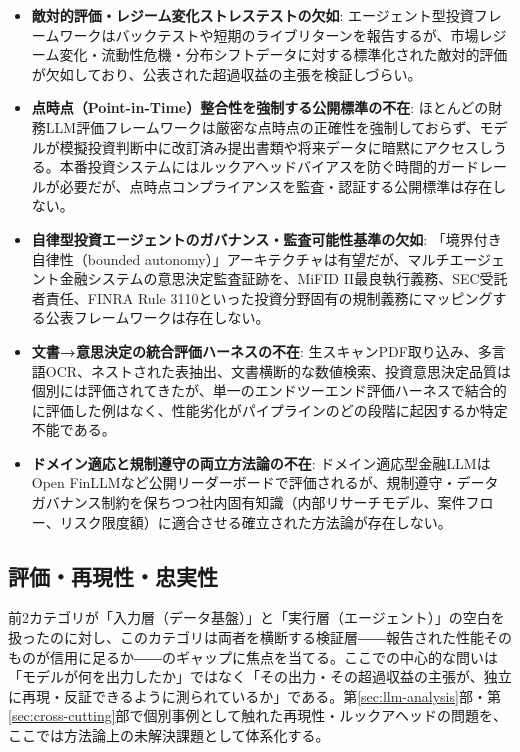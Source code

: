 \begin{itemize}
  \item \textbf{敵対的評価・レジーム変化ストレステストの欠如}: エージェント型投資フレームワークはバックテストや短期のライブリターンを報告するが、市場レジーム変化・流動性危機・分布シフトデータに対する標準化された敵対的評価が欠如しており、公表された超過収益の主張を検証しづらい。
  \item \textbf{点時点（Point-in-Time）整合性を強制する公開標準の不在}: ほとんどの財務LLM評価フレームワークは厳密な点時点の正確性を強制しておらず、モデルが模擬投資判断中に改訂済み提出書類や将来データに暗黙にアクセスしうる。本番投資システムにはルックアヘッドバイアスを防ぐ時間的ガードレールが必要だが、点時点コンプライアンスを監査・認証する公開標準は存在しない。
  \item \textbf{自律型投資エージェントのガバナンス・監査可能性基準の欠如}: 「境界付き自律性（bounded autonomy）」アーキテクチャは有望だが、マルチエージェント金融システムの意思決定監査証跡を、MiFID II最良執行義務、SEC受託者責任、FINRA Rule 3110といった投資分野固有の規制義務にマッピングする公表フレームワークは存在しない。
  \item \textbf{文書→意思決定の統合評価ハーネスの不在}: 生スキャンPDF取り込み、多言語OCR、ネストされた表抽出、文書横断的な数値検索、投資意思決定品質は個別には評価されてきたが、単一のエンドツーエンド評価ハーネスで結合的に評価した例はなく、性能劣化がパイプラインのどの段階に起因するか特定不能である。
  \item \textbf{ドメイン適応と規制遵守の両立方法論の不在}: ドメイン適応型金融LLMはOpen FinLLM\cite{finllmleaderboard2025}など公開リーダーボードで評価されるが、規制遵守・データガバナンス制約を保ちつつ社内固有知識（内部リサーチモデル、案件フロー、リスク限度額）に適合させる確立された方法論が存在しない。
\end{itemize}

\subsection{評価・再現性・忠実性}

前2カテゴリが「入力層（データ基盤）」と「実行層（エージェント）」の空白を扱ったのに対し、このカテゴリは両者を横断する検証層――報告された性能そのものが信用に足るか――のギャップに焦点を当てる。ここでの中心的な問いは「モデルが何を出力したか」ではなく「その出力・その超過収益の主張が、独立に再現・反証できるように測られているか」である。第\ref{sec:llm-analysis}部・第\ref{sec:cross-cutting}部で個別事例として触れた再現性・ルックアヘッドの問題を、ここでは方法論上の未解決課題として体系化する。

